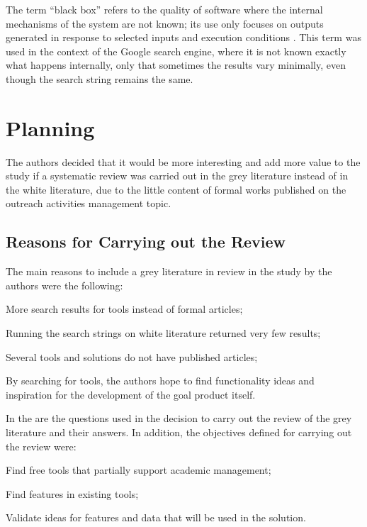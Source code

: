 The term ``black box'' refers to the quality of software where the internal mechanisms of the system are not known; its use only focuses on outputs generated in response to selected inputs and execution conditions . This term was used in the context of the Google search engine, where it is not known exactly what happens internally, only that sometimes the results vary minimally, even though the search string remains the same.

\section{Planning}\label{sec:gl-planning}

The authors decided that it would be more interesting and add more value to the study if a systematic review was carried out in the grey literature instead of in the white literature, due to the little content of formal works published on the outreach activities management topic.

\subsection{Reasons for Carrying out the Review}\label{sec:gl-planning-motives}

The main reasons to include a grey literature in review in the study by the authors were the following:
\begin{inparaenum}[(i)]
  \item More search results for tools instead of formal articles;
  \item Running the search strings on white literature returned very few results;
  \item Several tools and solutions do not have published articles;
  \item By searching for tools, the authors hope to find functionality ideas and inspiration for the development of the goal product itself.
\end{inparaenum}

In the  are the questions used in the decision to carry out the review of the grey literature and their answers. In addition, the objectives defined for carrying out the review were:

\begin{inparaenum}[(i)]
  \item Find free tools that partially support academic management;
  \item Find features in existing tools;
  \item Validate ideas for features and data that will be used in the solution.
\end{inparaenum}

